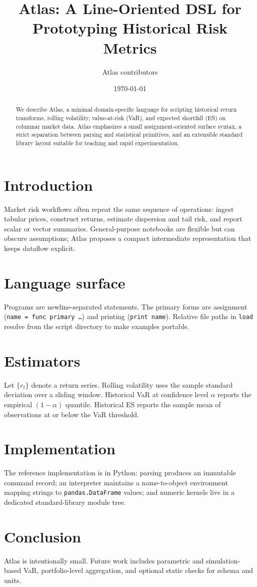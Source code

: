 \documentclass[11pt,a4paper]{article}
\title{Atlas: A Line-Oriented DSL for Prototyping Historical Risk Metrics}
\author{Atlas contributors}
\date{\today}
\begin{document}
\maketitle

\begin{abstract}
We describe Atlas, a minimal domain-specific language for scripting
historical return transforms, rolling volatility, value-at-risk (VaR),
and expected shortfall (ES) on columnar market data. Atlas emphasizes
a small assignment-oriented surface syntax, a strict separation between
parsing and statistical primitives, and an extensible standard library
layout suitable for teaching and rapid experimentation.
\end{abstract}

\section{Introduction}
Market risk workflows often repeat the same sequence of operations:
ingest tabular prices, construct returns, estimate dispersion and tail
risk, and report scalar or vector summaries. General-purpose notebooks
are flexible but can obscure assumptions; Atlas proposes a compact
intermediate representation that keeps dataflow explicit.

\section{Language surface}
Programs are newline-separated statements. The primary forms are
assignment (\texttt{name = func primary \ldots}) and printing
(\texttt{print name}). Relative file paths in \texttt{load} resolve
from the script directory to make examples portable.

\section{Estimators}
Let $\{r_t\}$ denote a return series. Rolling volatility uses the
sample standard deviation over a sliding window. Historical VaR at
confidence level $\alpha$ reports the empirical $(1-\alpha)$ quantile.
Historical ES reports the sample mean of observations at or below the
VaR threshold.

\section{Implementation}
The reference implementation is in Python: parsing produces an
immutable command record; an interpreter maintains a name-to-object
environment mapping strings to \texttt{pandas.DataFrame} values; and
numeric kernels live in a dedicated standard-library module tree.

\section{Conclusion}
Atlas is intentionally small. Future work includes parametric and
simulation-based VaR, portfolio-level aggregation, and optional static
checks for schema and units.
\end{document}

